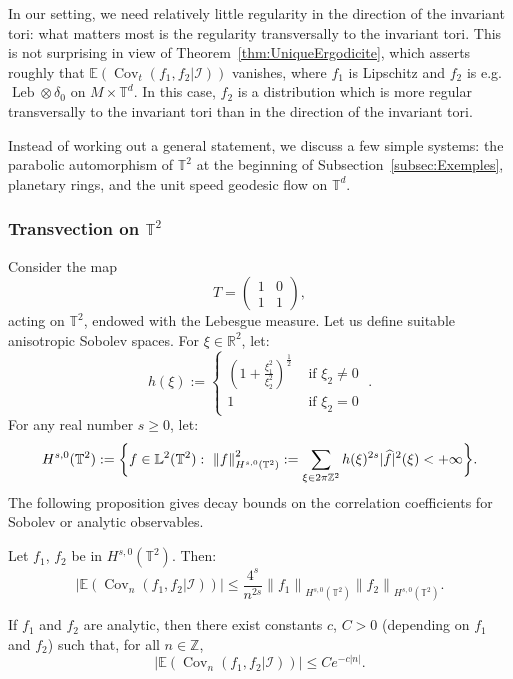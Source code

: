 \documentclass[10pt]{amsart}
\theoremstyle{definition}\newtheorem{defi}[theo]{Definition}\newtheorem{rema}[theo]{Remark}\newtheorem{exam}[theo]{Example}\newtheorem{exem}[theo]{Example}\newtheorem{nota}[theo]{Notation}
\DeclareMathOperator{\Cov}{Cov}
\DeclareMathOperator{\Leb}{Leb}
\newcommand{\Z}{\mathbb{Z}}
\newcommand{\R}{\mathbb{R}}
\newcommand{\Ebb}{\mathbb{E}}
\newcommand{\Lbb}{\mathbb{L}}
\newcommand{\Tbb}{\mathbb{T}}
\newcommand{\Ical}{\mathcal{I}}
\newcommand{\norm}[2]{\left\| #1 \right\|_{#2}}
\renewcommand*{\hat}[1]{\mathchoice{\widehat{#1}}{\widehat{#1}}{\oldhat{#1}}{\oldhat{#1}}}\let\oldforall\forall
\renewcommand*{\forall}{\mathrel{\oldforall}}
\begin{document}

In our setting, we need relatively little regularity in the direction of the invariant tori: what matters most is the regularity transversally to the invariant tori. This is not surprising in view of Theorem~\ref{thm:UniqueErgodicite}, which asserts roughly that $\Ebb (\Cov_t (f_1, f_2|\Ical))$ vanishes, where $f_1$ is Lipschitz and $f_2$ is e.g. $\Leb \otimes \delta_0$ on $M \times \Tbb^d$. In this case, $f_2$ is a distribution which is more regular transversally to the invariant tori than in the direction of the invariant tori.


Instead of working out a general statement, we discuss a few simple systems: the parabolic automorphism of $\Tbb^2$ at the beginning of Subsection~\ref{subsec:Exemples}, planetary rings, and the unit speed geodesic flow on $\Tbb^d$.


\subsubsection{Transvection on \texorpdfstring{$\Tbb^2$}{Tbb2}}\label{subsubsec:VitesseTransvection}

Consider the map
\begin{equation}\label{eq:DefinitionTransvection}
T =
\begin{pmatrix}
1 & 0 \\
1 & 1
\end{pmatrix},
\end{equation}
acting on $\Tbb^2$, endowed with the Lebesgue measure. Let us define suitable anisotropic Sobolev spaces. For $\xi \in \R^2$, let:
\[
h (\xi) :=
\begin{cases}
\left(1+\frac{\xi_1^2}{\xi_2^2} \right)^{\frac{1}{2}} & \text{ if } \xi_2 \neq 0 \\
1 & \text{ if } \xi_2 = 0
\end{cases}\;.
\]
For any real number $s \geq 0$, let:
\[
H^{s,0} (\Tbb^2) := \bigg\{ f \in \Lbb^2 (\Tbb^2): \ \norm{f}{H^{s,0} (\Tbb^2)}^2 := \sum_{\xi \in 2\pi\Z^2} h(\xi)^{2s} |\hat{f}|^2 (\xi) <+\infty \bigg\}.
\]
The following proposition gives decay bounds on the correlation coefficients for Sobolev or analytic observables.


\begin{prop}\label{prop:VitesseTransvection}

Let $f_1$, $f_2$ be in $H^{s,0} (\Tbb^2)$. Then:
\[
\big| \Ebb (\Cov_n (f_1, f_2|\Ical)) \big|
\leq \frac{4^s}{n^{2s}} \norm{f_1}{H^{s,0} (\Tbb^2)} \norm{f_2}{H^{s,0} (\Tbb^2)}.
\]

If $f_1$ and $f_2$ are analytic, then there exist constants $c$, $C>0$ (depending on $f_1$ and $f_2$) such that, for all $n \in \Z$,
\[
\big| \Ebb (\Cov_n (f_1, f_2|\Ical)) \big|
\leq C e^{-c|n|}.
\]
\end{prop}
\end{document}
